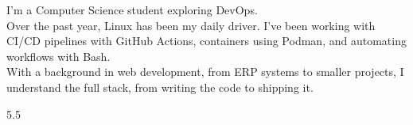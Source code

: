 \documentclass[9pt]{developercv} %
\begin{document}
\vspace{0.5cm} %



\begin{minipage}[t]{0.45\textwidth} %
	\vspace{-\baselineskip} %

	I’m a Computer Science student exploring DevOps.
	\\[0.3\baselineskip]
	Over the past year, Linux has been my daily driver. I've been working with
	CI/CD pipelines with GitHub Actions, containers using Podman, and
	automating workflows with Bash.
	\\[0.3\baselineskip]
	With a background in web development, from ERP systems to smaller projects, I
	understand the full stack, from writing the code to shipping it.

\end{minipage}
\hfill %
\begin{minipage}[t]{0.5\textwidth} %
	\vspace{-\baselineskip} %

	\begin{barchart}{5.5} %
	\end{barchart}
\end{minipage}


\end{document}
